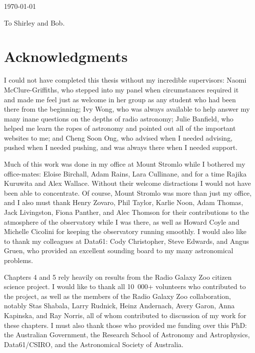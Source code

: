 \documentclass[11pt, a4paper]{book}
\begin{document}
\vspace*{4cm}

\hspace{8cm}\makeatletter\@author\makeatother\par
\hspace{8cm}\today


\cleardoublepage
\pagestyle{empty}
\vspace*{7cm}
\begin{center}
    To Shirley and Bob.
\end{center}


\cleardoublepage
\pagestyle{empty}
\chapter*{Acknowledgments}

I could not have completed this thesis without my incredible supervisors: Naomi McClure-Griffiths, who stepped into my panel when circumstances required it and made me feel just as welcome in her group as any student who had been there from the beginning; Ivy Wong, who was always available to help answer my many inane questions on the depths of radio astronomy; Julie Banfield, who helped me learn the ropes of astronomy and pointed out all of the important websites to me; and Cheng Soon Ong, who advised when I needed advising, pushed when I needed pushing, and was always there when I needed support.

Much of this work was done in my office at Mount Stromlo while I bothered my office-mates: Eloise Birchall, Adam Rains, Lara Cullinane, and for a time Rajika Kuruwita and Alex Wallace. Without their welcome distractions I would not have been able to concentrate. Of course, Mount Stromlo was more than just my office, and I also must thank Henry Zovaro, Phil Taylor, Karlie Noon, Adam Thomas, Jack Livingston, Fiona Panther, and Alec Thomson for their contributions to the atmosphere of the observatory while I was there, as well as Howard Coyle and Michelle Cicolini for keeping the observatory running smoothly. I would also like to thank my colleagues at Data61: Cody Christopher, Steve Edwards, and Angus Gruen, who provided an excellent sounding board to my many astronomical problems.

Chapters 4 and 5 rely heavily on results from the Radio Galaxy Zoo citizen science project. I would like to thank all 10~000+ volunteers who contributed to the project, as well as the members of the Radio Galaxy Zoo collaboration, notably Stas Shabala, Larry Rudnick, Heinz Andernach, Avery Garon, Anna Kapinska, and Ray Norris, all of whom contributed to discussion of my work for these chapters. I must also thank those who provided me funding over this PhD: the Australian Government, the Research School of Astronomy and Astrophysics, Data61/CSIRO, and the Astronomical Society of Australia.
\end{document}
